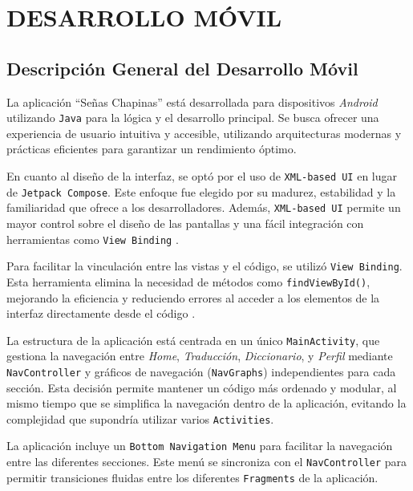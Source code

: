 
\section{DESARROLLO MÓVIL}

\subsection{Descripción General del Desarrollo Móvil}

La aplicación ``Señas Chapinas'' está desarrollada para dispositivos \textit{Android} utilizando \texttt{Java} para la lógica y el desarrollo principal. Se busca ofrecer una experiencia de usuario intuitiva y accesible, utilizando arquitecturas modernas y prácticas eficientes para garantizar un rendimiento óptimo.

En cuanto al diseño de la interfaz, se optó por el uso de \texttt{XML-based UI} en lugar de \texttt{Jetpack Compose}. Este enfoque fue elegido por su madurez, estabilidad y la familiaridad que ofrece a los desarrolladores. Además, \texttt{XML-based UI} permite un mayor control sobre el diseño de las pantallas y una fácil integración con herramientas como \texttt{View Binding} \cite{DeLaGrana2024}.

Para facilitar la vinculación entre las vistas y el código, se utilizó \texttt{View Binding}. Esta herramienta elimina la necesidad de métodos como \texttt{findViewById()}, mejorando la eficiencia y reduciendo errores al acceder a los elementos de la interfaz directamente desde el código \cite{Ozaltun2022}.

La estructura de la aplicación está centrada en un único \texttt{MainActivity}, que gestiona la navegación entre \textit{Home}, \textit{Traducción}, \textit{Diccionario}, y \textit{Perfil} mediante \texttt{NavController} y gráficos de navegación (\texttt{NavGraphs}) independientes para cada sección. Esta decisión permite mantener un código más ordenado y modular, al mismo tiempo que se simplifica la navegación dentro de la aplicación, evitando la complejidad que supondría utilizar varios \texttt{Activities}.

La aplicación incluye un \texttt{Bottom Navigation Menu} para facilitar la navegación entre las diferentes secciones. Este menú se sincroniza con el \texttt{NavController} para permitir transiciones fluidas entre los diferentes \texttt{Fragments} de la aplicación.

